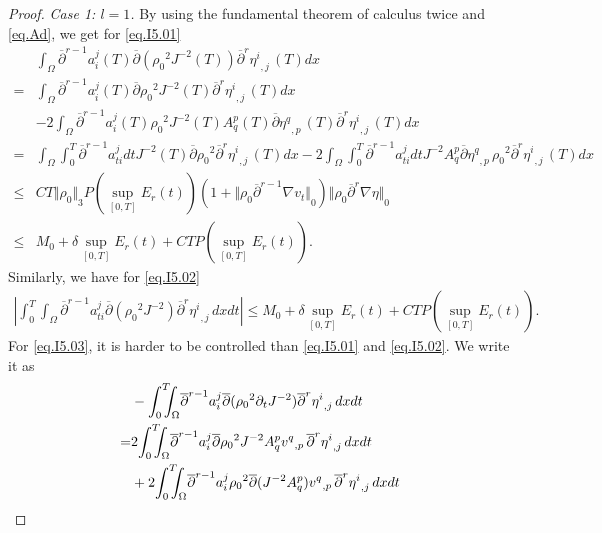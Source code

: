 \documentclass[12pt,twoside,reqno]{amsart}
\numberwithin{equation}{section}
\theoremstyle{definition}
\theoremstyle{remark}
\begin{document}
\begin{proof}
\emph{Case 1: $l=1$.} By using the fundamental theorem of calculus twice and \eqref{eq.Ad}, we get for \eqref{eq.I5.01}
\begin{align*}
  &\int_\Omega {\overline{\partial}}^{r-1} a^j_i(T){\overline{\partial}}({\rho_0}^2  J^{-2}(T)){\overline{\partial}}^r{{{\eta^i}}_{,{j}}\,}(T)dx\\
  =&\int_\Omega {\overline{\partial}}^{r-1} a^j_i(T) {\overline{\partial}}{\rho_0}^2  J^{-2}(T){\overline{\partial}}^r{{{\eta^i}}_{,{j}}\,}(T)dx\\
  &-2\int_\Omega {\overline{\partial}}^{r-1} a^j_i(T){\rho_0}^2  J^{-2}(T)A^p_q(T){\overline{\partial}}{{{\eta^q}}_{,{p}}\,}(T){\overline{\partial}}^r{{{\eta^i}}_{,{j}}\,}(T)dx\\
  =&\int_\Omega \int_0^T{\overline{\partial}}^{r-1} a^j_{ti}dt J^{-2}(T){\overline{\partial}}{\rho_0}^2  {\overline{\partial}}^r{{{\eta^i}}_{,{j}}\,}(T)dx-2\int_\Omega\int_0^T{\overline{\partial}}^{r-1} a^j_{ti}dt J^{-2} A^p_{q}{\overline{\partial}}{{{\eta^q}}_{,{p}}\,}{\rho_0}^2  {\overline{\partial}}^r{{{\eta^i}}_{,{j}}\,}(T)dx\\
  {\leqslant}&CT{\Vert{\rho_0}\Vert}_3 P(\sup_{[0,T]}E_r(t))\left(1+{\Vert{{\rho_0} {\overline{\partial}}^{r-1}{\nabla} v_t}\Vert}_0\right){\Vert{{\rho_0} {\overline{\partial}}^r{\nabla}\eta}\Vert}_0\\
  {\leqslant} &M_0+\delta\sup_{[0,T]}E_r(t)+CTP(\sup_{[0,T]}E_r(t)).
\end{align*}
Similarly, we have for \eqref{eq.I5.02}
\begin{align*}
  {\left\vert{{\int_0^T\!\!\!\!\int_\Omega } {\overline{\partial}}^{r-1} a_{ti}^j{\overline{\partial}} ({\rho_0}^2  J^{-2}){\overline{\partial}}^r{{{\eta^i}}_{,{j}}\,}dxdt}\right\vert}{\leqslant} M_0+\delta\sup_{[0,T]}E_r(t)+CTP(\sup_{[0,T]}E_r(t)).
\end{align*}
For \eqref{eq.I5.03}, it is harder to be controlled than \eqref{eq.I5.01} and \eqref{eq.I5.02}. We write it as
\begin{align}
&-{\int_0^T\!\!\!\!\int_\Omega }  {\overline{\partial}}^{r-1} a_i^j{\overline{\partial}} ({\rho_0}^2  {\partial}_t J^{-2}){\overline{\partial}}^r{{{\eta^i}}_{,{j}}\,}dxdt{\nonumber}\\
=&2{\int_0^T\!\!\!\!\int_\Omega }  {\overline{\partial}}^{r-1} a_i^j {\overline{\partial}}{\rho_0}^2   J^{-2}A^p_q{{{v^q}}_{,{p}}\,}{\overline{\partial}}^r{{{\eta^i}}_{,{j}}\,}dxdt\label{eq.I5.1}\\
  &+2{\int_0^T\!\!\!\!\int_\Omega }  {\overline{\partial}}^{r-1} a_i^j {\rho_0}^2  {\overline{\partial}}( J^{-2}A^p_q){{{v^q}}_{,{p}}\,}{\overline{\partial}}^r{{{\eta^i}}_{,{j}}\,}dxdt\label{eq.I5.2}\\

\end{align}
\end{proof}
\end{document}
